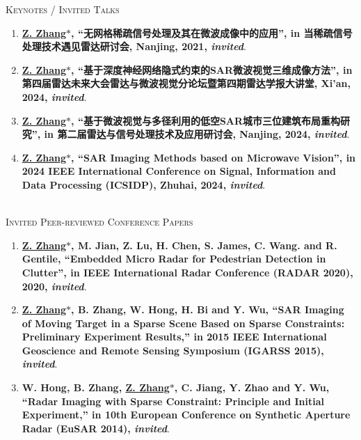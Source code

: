 \documentclass[paper=a4,fontsize=11pt]{scrartcl}
\begin{document}
\textsc{Keynotes / Invited Talks}

\begin{enumerate}
	
	\item \textbf{\underline{Z. Zhang$\ast$}, ``无网格稀疏信号处理及其在微波成像中的应用'', in 当稀疏信号处理技术遇见雷达研讨会, Nanjing, 2021, \emph{invited}}.
	
	\item \textbf{\underline{Z. Zhang$\ast$}, ``基于深度神经网络隐式约束的SAR微波视觉三维成像方法'', in 第四届雷达未来大会雷达与微波视觉分论坛暨第四期雷达学报大讲堂, Xi'an, 2024, \emph{invited}}.
	
	\item \textbf{\underline{Z. Zhang$\ast$}, ``基于微波视觉与多径利用的低空SAR城市三位建筑布局重构研究'', in 第二届雷达与信号处理技术及应用研讨会, Nanjing, 2024, \emph{invited}}.
	
	\item \textbf{\underline{Z. Zhang$\ast$}, ``SAR Imaging Methods based on Microwave Vision'', in 2024 IEEE International Conference on Signal, Information and Data Processing (ICSIDP), Zhuhai, 2024, \emph{invited}}.
	
\end{enumerate}

~\\

\textsc{Invited Peer-reviewed Conference Papers}

\begin{enumerate}
	
	\item \textbf{\underline{Z. Zhang$\ast$}, M. Jian, Z. Lu, H. Chen, S. James, C. Wang. and R. Gentile, ``Embedded Micro Radar for Pedestrian Detection in Clutter'', in IEEE International Radar Conference (RADAR 2020), 2020, \emph{invited}}.
	
	\item \textbf{\underline{Z. Zhang$\ast$}, B. Zhang, W. Hong, H. Bi and Y. Wu, ``SAR Imaging of Moving Target in a Sparse Scene Based on Sparse Constraints: Preliminary Experiment Results,'' in 2015 IEEE International Geoscience and Remote Sensing Symposium (IGARSS 2015), \emph{invited}}.
	
	\item \textbf{W. Hong, B. Zhang, \underline{Z. Zhang$\ast$}, C. Jiang, Y. Zhao and Y. Wu, ``Radar Imaging with Sparse Constraint: Principle and Initial Experiment,'' in 10th European Conference on Synthetic Aperture Radar (EuSAR 2014), \emph{invited}}.
	
	
\end{enumerate}
\end{document}
